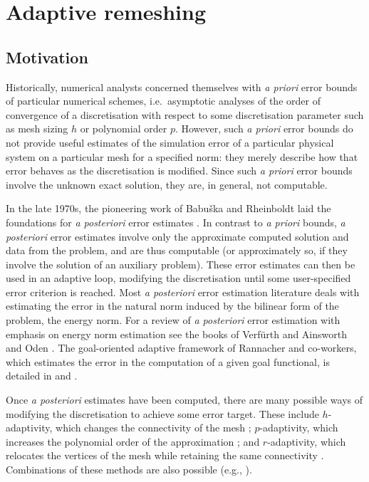 
\chapter{Adaptive remeshing}\label{chap:Adaptivity}

\section{Motivation}
Historically, numerical analysts concerned themselves
with \emph{a priori} error bounds of particular numerical
schemes, i.e.\@ \ asymptotic analyses of the order of convergence
of a discretisation with respect to some discretisation parameter
such as mesh sizing $h$ or polynomial order $p$. However, such
\emph{a priori} error bounds do not provide useful estimates
of the simulation error of a particular physical system on
a particular mesh for a specified norm: they merely describe
how that error behaves as the discretisation is modified. Since
such \emph{a priori} error bounds involve the unknown exact solution,
they are, in general, not computable.

In the late 1970s, the pioneering work of Babu\v ska
and Rheinboldt laid the foundations for \emph{a posteriori}
error estimates \citep{babuska1978,babuska1978b}.
In contrast to \emph{a priori} bounds,
\emph{a posteriori} error estimates involve only
the approximate computed solution and data from the problem,
and are thus computable (or approximately so, if they involve the
solution of an auxiliary problem). These error
estimates can then be used in an adaptive loop, modifying
the discretisation until some user-specified error criterion
is reached. Most \emph{a posteriori} error estimation literature deals with estimating
the error in the natural norm induced by the bilinear form
of the problem, the energy norm.
For a review of \emph{a posteriori} error estimation
with emphasis on energy norm estimation
see the books of Verf\"urth \citep{verfurth1996} and
Ainsworth and Oden \citep{ainsworth2000}. The goal-oriented
adaptive framework of Rannacher and co-workers, which estimates
the error in the computation of a given goal functional, is detailed
in \citet{becker2001} and \citet{bangerth2003}.

Once \emph{a posteriori} estimates have been computed,
there are many possible ways of modifying the discretisation
to achieve some error target. These include $h$-adaptivity,
which changes the connectivity of the mesh \citep{berger1989}; $p$-adaptivity,
which increases the polynomial order of the approximation
\citep{babuska1994}; and $r$-adaptivity, which relocates
the vertices of the mesh while retaining the same connectivity
\citep{budd2009}. Combinations of these methods are also
possible (e.g., \citet{houston2001,ledger2003}).

